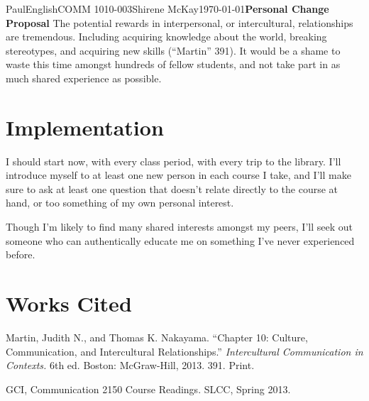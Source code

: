 \documentclass[12pt,letterpaper]{article}
\begin{document}
\begin{mla}{Paul}{English}{COMM 1010-003}{Shirene
    McKay}{\today}{\textbf{Personal Change Proposal}}
The potential rewards in interpersonal, or intercultural,
relationships are tremendous. Including acquiring knowledge about the
world, breaking stereotypes, and acquiring new skills (``Martin'' 391). It
would be a shame to waste this time amongst hundreds of fellow
students, and not take part in as much shared experience as possible.

\section{Implementation}


I should start now, with every class period, with every trip to the
library. I'll introduce myself to at least one new person in each
course I take, and I'll make sure to ask at least one question that
doesn't relate directly to the course at hand, or too something of my
own personal interest.

Though I'm likely to find many shared interests amongst my peers, I'll
seek out someone who can authentically educate me on something I've
never experienced before.

\pagebreak
\section{Works Cited}

\bibent
Martin, Judith N., and Thomas K. Nakayama. ``Chapter 10: Culture,
Communication, and Intercultural Relationships.''
\textit{Intercultural Communication in Contexts.} 6th ed. Boston: 
McGraw-Hill, 2013. 391. Print.

\bibent
GCI, Communication 2150 Course Readings. SLCC, Spring 2013.

\end{mla}
\end{document}
